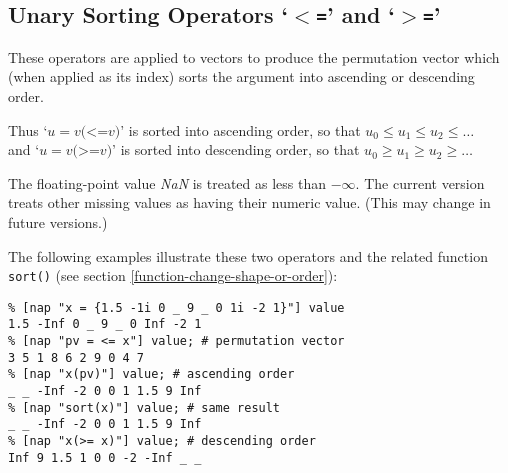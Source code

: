 \subsection{Unary Sorting Operators `\texttt{$<$=}' and `\texttt{$>$=}'}
    \label{op-Sorting}

These operators are applied to vectors to produce the
  permutation vector which (when applied as its index) sorts the
  argument into ascending or descending order.
  
Thus 
`$u = v\texttt{(<=} v\texttt{)}$'
  is sorted into ascending order, so that 
  $u_0 \le u_1 \le u_2 \le \ldots$
  \\
  and 
`$u = v\texttt{(>=} v\texttt{)}$'
  is sorted into descending order, so that 
  $u_0 \ge u_1 \ge u_2 \ge \ldots$
  
 The floating-point value 
  \textit{NaN} is treated as less than $-\infty$.
  The current
  version treats other missing values as having their numeric value.
  (This may change in future versions.)
  
 The following examples illustrate these two operators and the related 
function \texttt{sort()}
(see section \ref{function-change-shape-or-order}):
  \begin{verbatim}
% [nap "x = {1.5 -1i 0 _ 9 _ 0 1i -2 1}"] value
1.5 -Inf 0 _ 9 _ 0 Inf -2 1
% [nap "pv = <= x"] value; # permutation vector
3 5 1 8 6 2 9 0 4 7
% [nap "x(pv)"] value; # ascending order
_ _ -Inf -2 0 0 1 1.5 9 Inf
% [nap "sort(x)"] value; # same result
_ _ -Inf -2 0 0 1 1.5 9 Inf
% [nap "x(>= x)"] value; # descending order
Inf 9 1.5 1 0 0 -2 -Inf _ _
\end{verbatim}
